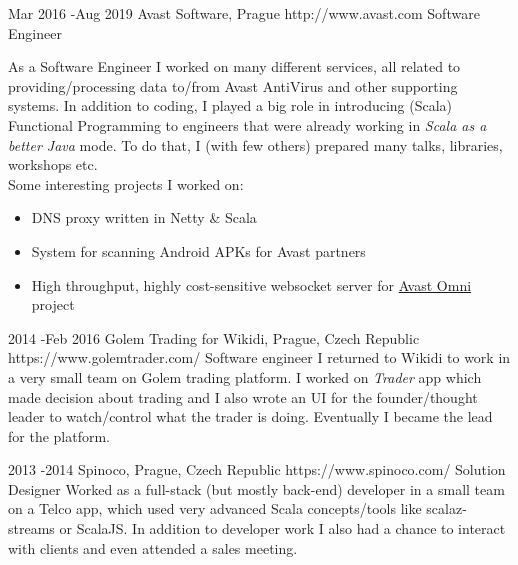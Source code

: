 \documentclass[10pt]{article} %
\begin{document}

\job
{Mar 2016 -}{Aug 2019}
{Avast Software, Prague}
{http://www.avast.com}
{Software Engineer}
{As a Software Engineer I worked on many different services, all related to providing/processing data to/from Avast AntiVirus and other supporting systems. In addition to coding,
    I played a big role in introducing (Scala) Functional Programming to engineers that were already working in \emph{Scala as a better Java} mode.
To do that, I (with few others) prepared many talks, libraries, workshops etc. \\ Some interesting projects I worked on:
\begin{itemize}
    \item DNS proxy written in Netty \& Scala
    \item System for scanning Android APKs for Avast partners
    \item High throughput, highly cost-sensitive websocket server for \href{https://www.avast.com/en-us/omni}{Avast Omni} project
\end{itemize}

}


\job
{2014 -}{Feb 2016}
{Golem Trading for Wikidi, Prague, Czech Republic}
{https://www.golemtrader.com/}
{Software engineer}
{I returned to Wikidi to work in a very small team on Golem trading platform. I worked on \emph{Trader} app which made decision about trading and I also wrote an UI for the founder/thought leader to watch/control what the trader is doing. Eventually I became the lead for the platform. \\
}


\job
{2013 -}{2014 }
{Spinoco, Prague, Czech Republic}
{https://www.spinoco.com/}
{Solution Designer}
{Worked as a full-stack (but mostly back-end) developer in a small team on a Telco app, which used very advanced Scala concepts/tools like scalaz-streams or ScalaJS. In addition to developer work I also had a chance to interact with clients and even attended a sales meeting.\\
}
\end{document}
